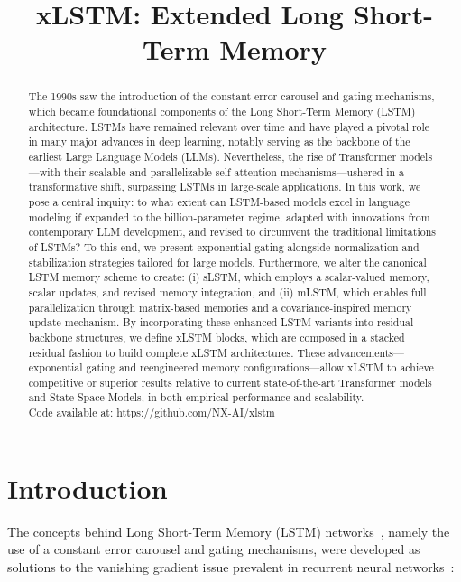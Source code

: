 \title{xLSTM: Extended Long Short-Term Memory}

\begin{abstract}
The 1990s saw the introduction of the constant error carousel and gating mechanisms, which became foundational components of the Long Short-Term Memory (LSTM) architecture. LSTMs have remained relevant over time and have played a pivotal role in many major advances in deep learning, notably serving as the backbone of the earliest Large Language Models (LLMs). Nevertheless, the rise of Transformer models—with their scalable and parallelizable self-attention mechanisms—ushered in a transformative shift, surpassing LSTMs in large-scale applications. In this work, we pose a central inquiry: to what extent can LSTM-based models excel in language modeling if expanded to the billion-parameter regime, adapted with innovations from contemporary LLM development, and revised to circumvent the traditional limitations of LSTMs? To this end, we present exponential gating alongside normalization and stabilization strategies tailored for large models. Furthermore, we alter the canonical LSTM memory scheme to create: (i) sLSTM, which employs a scalar-valued memory, scalar updates, and revised memory integration, and (ii) mLSTM, which enables full parallelization through matrix-based memories and a covariance-inspired memory update mechanism. By incorporating these enhanced LSTM variants into residual backbone structures, we define xLSTM blocks, which are composed in a stacked residual fashion to build complete xLSTM architectures. These advancements—exponential gating and reengineered memory configurations—allow xLSTM to achieve competitive or superior results relative to current state-of-the-art Transformer models and State Space Models, in both empirical performance and scalability.\\
Code available at: \url{https://github.com/NX-AI/xlstm}
\end{abstract}

\section{Introduction}
\label{sec:intro}

The concepts behind Long Short-Term Memory (LSTM) networks~\citep{Hochreiter:91,Hochreiter:97nips,Hochreiter:97}, namely the use of a constant error carousel and gating mechanisms, were developed as solutions to the vanishing gradient issue prevalent in recurrent neural networks~\citep{Hochreiter:91,Hochreiter:00book}:

